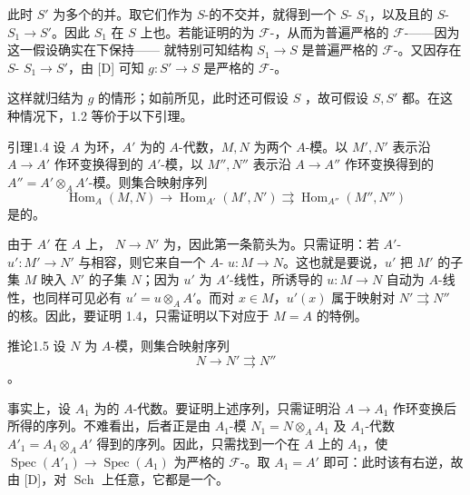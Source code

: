 此时 $S'$ 为多个的并。取它们作为 $S$-的不交并，就得到一个 $S$- $S_1$，以及且的 $S$- $S_1\to S'$。因此 $S_1$ 在 $S$ 上也。若能证明的为 $\mathcal F$-，从而为普遍严格的 $\mathcal F$-——因为这一假设确实在下保持——
就特别可知结构 $S_1\to S$ 是普遍严格的 $\mathcal F$-。又因存在 $S$- $S_1\to S'$，由 [D] 可知 $g:S'\to S$ 是严格的 $\mathcal F$-。

这样就归结为 $g$ 的情形；如前所见，此时还可假设 $S$ ，故可假设 $S,S'$ 都。在这种情况下，1.2 等价于以下引理。

\begin{SGAresult}{引理}{1.4}
设 $A$ 为环，$A'$ 为的 $A$-代数，$M,N$ 为两个 $A$-模。以 $M',N'$ 表示沿 $A\to A'$ 作环变换得到的 $A'$-模，以 $M'',N''$ 表示沿 $A\to A''$ 作环变换得到的 $A''=A'\otimes_A A'$-模。则集合映射序列
\[
\operatorname{Hom}_A(M,N)\longrightarrow
\operatorname{Hom}_{A'}(M',N')\rightrightarrows
\operatorname{Hom}_{A''}(M'',N'')
\]
是的。
\end{SGAresult}
由于 $A'$ 在 $A$ 上， $N\to N'$ 为，因此第一条箭头为。只需证明：若 $A'$- $u':M'\to N'$ 与相容，则它来自一个 $A$- $u:M\to N$。这也就是要说，$u'$ 把 $M'$ 的子集 $M$ 映入 $N'$ 的子集 $N$；因为 $u'$ 为 $A'$-线性，所诱导的 $u:M\to N$ 自动为 $A$-线性，也同样可见必有 $u'=u\otimes_A A'$。而对 $x\in M$，$u'(x)$ 属于映射对 $N'\rightrightarrows N''$ 的核。因此，要证明 1.4，只需证明以下对应于 $M=A$ 的特例。

\begin{SGAresult}{推论}{1.5}
设 $N$ 为 $A$-模，则集合映射序列
\[
N\longrightarrow N'\rightrightarrows N''
\]
。
\end{SGAresult}
事实上，设 $A_1$ 为的 $A$-代数。要证明上述序列，只需证明沿 $A\to A_1$ 作环变换后所得的序列。不难看出，后者正是由 $A_1$-模 $N_1=N\otimes_A A_1$ 及 $A_1$-代数 $A'_1=A_1\otimes_A A'$ 得到的序列。因此，只需找到一个在 $A$ 上的 $A_1$，使 $\operatorname{Spec}(A'_1)\to\operatorname{Spec}(A_1)$ 为严格的 $\mathcal F$-。取 $A_1=A'$ 即可：此时该有右逆，故由 [D]，对 $\operatorname{Sch}$ 上任意，它都是一个。

